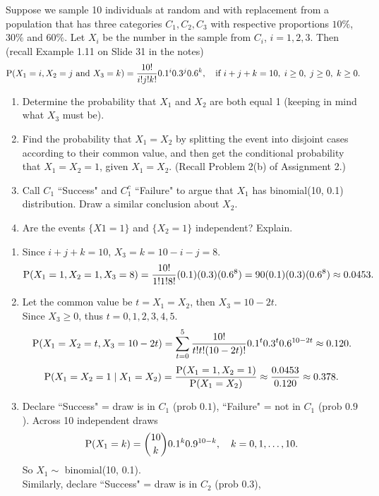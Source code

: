 \documentclass[12pt]{article}
\newcommand{\Prob}{{\rm P}}
\newenvironment{problem}[2][Problem]{\begin{trivlist}
\item[\hskip \labelsep {\bfseries #1}\hskip \labelsep {\bfseries #2.}]}
{\end{trivlist}}
\begin{document}
\begin{problem}{2}
  Suppose we sample 10 individuals at random and with replacement from a 
  population that has three categories $C_1, C_2, C_3$ with respective 
  proportions $10\%$, $30\%$ and $60\%$. Let $X_i$ be the number in the 
  sample from $C_i$, $i = 1, 2, 3$. Then (recall Example 1.11 on Slide 
  31 in the notes)
  \[
    \Prob(X_1 = i, X_2 = j \text{ and } X_3 = k) = 
    \frac{10!}{i!j!k!}0.1^i0.3^j0.6^k, \quad
    \text{if } i+j+k=10,\; i \ge 0,\;j \ge 0,\; k \ge 0.
  \]
  \begin{enumerate}
    \item Determine the probability that $X_1$ and $X_2$ are both equal 1 
    (keeping in mind what $X_3$ must be).
    \item Find the probability that $X_1 = X_2$ by splitting the event into 
    disjoint cases according to their common value, and then get the 
    conditional probability that $X_1 = X_2 = 1$, given $X_1 = X_2$. 
    (Recall Problem 2(b) of Assignment 2.)
    \item Call $C_1$ ``Success" and $C_1^c$ ``Failure" to argue that 
    $X_1$ has binomial(10, 0.1) distribution. Draw a similar conclusion 
    about $X_2$.
    \item Are the events $\{X1 = 1\}$ and $\{X_2 = 1\}$ independent? Explain.
  \end{enumerate}
  \begin{enumerate}
    \item Since $i+j+k=10$, $X_3 = k = 10-i-j = 8$.
    \[
      \Prob(X_1=1,X_2=1,X_3=8) = 
      \frac{10!}{1!1!8!}(0.1)(0.3)(0.6^8) =
      90(0.1)(0.3)(0.6^8) \approx 0.0453.
    \]
    \item Let the common value be $t = X_1=X_2$, then $X_3 = 10-2t$.\\
    Since $X_3 \ge 0$, thus $t = 0,1,2,3,4,5$.
    \[
      \Prob(X_1=X_2=t, X_3=10-2t) =
      \sum_{t=0}^5 \frac{10!}{t!t!(10-2t)!}0.1^t0.3^t0.6^{10-2t}
      \approx 0.120.
    \]
    \[
      \Prob(X_1=X_2=1 \mid X_1=X_2) =
      \frac{\Prob(X_1=1,X_2=1)}{\Prob(X_1=X_2)} \approx
      \frac{0.0453}{0.120} \approx 0.378.
    \]
    \item Declare ``Success" = draw is in $C_1$ (prob $0.1$), 
    ``Failure" = not in $C_1$ (prob $0.9$). Across 10 independent draws
    \[
      \Prob(X_1 = k) = \binom{10}{k} 0.1^k 0.9^{10-k},\quad k=0,1,\ldots,10.
    \]
    So $X_1 \sim$ binomial(10, 0.1).\\
    Similarly, declare ``Success" = draw is in $C_2$ (prob $0.3$), 

\end{enumerate}
\end{problem}
\end{document}
